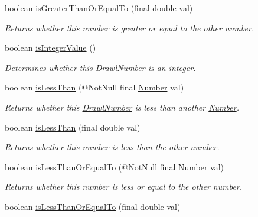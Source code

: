 \begin{DoxyCompactItemize}
boolean \hyperlink{classcom_1_1aarrelaakso_1_1drawl_1_1_drawl_number_a372a1c39c58497d16d02476d7ecd8299}{is\+Greater\+Than\+Or\+Equal\+To} (final double val)
\begin{DoxyCompactList}\small\item\em Returns whether this number is greater or equal to the other number. \end{DoxyCompactList}\item 
boolean \hyperlink{classcom_1_1aarrelaakso_1_1drawl_1_1_drawl_number_a520419e41b314adf719cfcd5939dee01}{is\+Integer\+Value} ()
\begin{DoxyCompactList}\small\item\em Determines whether this \hyperlink{classcom_1_1aarrelaakso_1_1drawl_1_1_drawl_number}{Drawl\+Number} is an integer. \end{DoxyCompactList}\item 
boolean \hyperlink{classcom_1_1aarrelaakso_1_1drawl_1_1_drawl_number_a6b5501320af37fd5aa623ed4bcbbd104}{is\+Less\+Than} (@Not\+Null final \hyperlink{interfacecom_1_1aarrelaakso_1_1drawl_1_1_number}{Number} val)
\begin{DoxyCompactList}\small\item\em Returns whether this \hyperlink{classcom_1_1aarrelaakso_1_1drawl_1_1_drawl_number}{Drawl\+Number} is less than another \hyperlink{interfacecom_1_1aarrelaakso_1_1drawl_1_1_number}{Number}. \end{DoxyCompactList}\item 
boolean \hyperlink{classcom_1_1aarrelaakso_1_1drawl_1_1_drawl_number_a01bc433270b27f6b50ea59fd0d5fcc90}{is\+Less\+Than} (final double val)
\begin{DoxyCompactList}\small\item\em Returns whether this number is less than the other number. \end{DoxyCompactList}\item 
boolean \hyperlink{classcom_1_1aarrelaakso_1_1drawl_1_1_drawl_number_af3936483f84eec933c41b7dc78bb473a}{is\+Less\+Than\+Or\+Equal\+To} (@Not\+Null final \hyperlink{interfacecom_1_1aarrelaakso_1_1drawl_1_1_number}{Number} val)
\begin{DoxyCompactList}\small\item\em Returns whether this number is less or equal to the other number. \end{DoxyCompactList}\item 
boolean \hyperlink{classcom_1_1aarrelaakso_1_1drawl_1_1_drawl_number_af112edcaa36d2518baab553fe11d39fe}{is\+Less\+Than\+Or\+Equal\+To} (final double val)

\end{DoxyCompactItemize}
